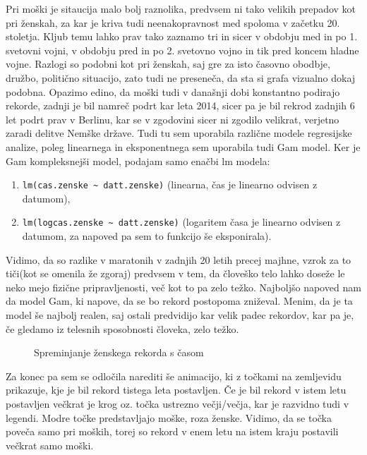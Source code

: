 \documentclass[11pt,a4paper]{article}
\begin{document}
Pri moški je sitaucija malo bolj raznolika, predvsem ni tako velikih prepadov kot pri ženskah, za kar je kriva tudi neenakopravnost med spoloma v začetku 20. stoletja. Kljub temu lahko prav tako zaznamo tri in sicer v obdobju med in po 1. svetovni vojni, v obdobju pred in po 2. svetovno vojno in tik pred koncem hladne vojne. Razlogi so podobni kot pri ženskah, saj gre za isto časovno obodbje, družbo, politično situacijo, zato tudi ne preseneča, da sta si grafa vizualno dokaj podobna. Opazimo edino, da moški tudi v današnji dobi konstantno podirajo rekorde, zadnji je bil namreč podrt kar leta 2014, sicer pa je bil rekrod zadnjih 6 let podrt prav v Berlinu, kar se v zgodovini sicer ni zgodilo velikrat, verjetno zaradi delitve Nemške države.
Tudi tu sem uporabila različne modele regresijske analize, poleg linearnega in  eksponentnega sem uporabila tudi Gam model. Ker je Gam kompleksnejši model, podajam samo enačbi lm modela:
\begin{enumerate}
\item{\verb|lm(cas.zenske ~ datt.zenske)| (linearna, čas je linearno odvisen z datumom),}
\item{\verb|lm(logcas.zenske ~ datt.zenske)| (logaritem časa je linearno odvisen z datumom, za napoved pa sem to funkcijo še eksponirala).}
\end{enumerate}
Vidimo, da so razlike v maratonih v zadnjih 20 letih precej majhne, vzrok za to tiči(kot se omenila že zgoraj) predvsem v tem, da človeško telo lahko doseže le neko mejo fizične pripravljenosti, več kot to pa zelo težko. Najboljšo napoved nam da model Gam, ki napove, da se bo rekord postopoma zniževal. Menim, da je ta model še najbolj realen, saj ostali predvidijo kar velik padec rekordov, kar pa je, če gledamo iz telesnih sposobnosti človeka, zelo težko.


\begin{figure}[H]
  \caption{Spreminjanje ženskega rekorda s časom}
  \label{fig:Slika 5}
\end{figure}

\newpage
Za konec pa sem se odločila narediti še animacijo, ki z točkami na zemljevidu prikazuje, kje je bil rekord tistega leta postavljen. Če je bil rekord v istem letu postavljen večkrat je krog oz. točka ustrezno večji/večja, kar je razvidno tudi v legendi. Modre točke predstavljajo moške, roza ženske.
Vidimo, da se točka poveča samo pri moških, torej so rekord v enem letu na istem kraju postavili večkrat samo moški.
\end{document}
